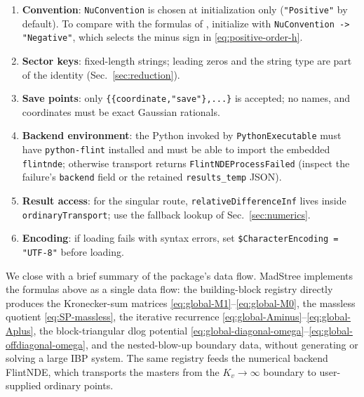 \documentclass[11pt,a4paper]{article}
\begin{document}
\begin{enumerate}
  \item \textbf{Convention}: \texttt{NuConvention} is chosen at initialization only
        (\texttt{"Positive"} by default). To compare with the formulas of
        \citet{Chen:2024jms}, initialize with \texttt{NuConvention -> "Negative"}, which selects
        the minus sign in \eqref{eq:positive-order-h}.
  \item \textbf{Sector keys}: fixed-length strings; leading zeros and the string type are part of
        the identity (Sec.~\ref{sec:reduction}).
  \item \textbf{Save points}: only \texttt{\{\{coordinate,"save"\},...\}} is accepted; no names,
        and coordinates must be exact Gaussian rationals.
  \item \textbf{Backend environment}: the Python invoked by \texttt{PythonExecutable} must have
        \texttt{python-flint} installed and must be able to import the embedded \texttt{flintnde};
        otherwise transport returns \texttt{FlintNDEProcessFailed} (inspect the failure's
        \texttt{backend} field or the retained \texttt{results\_temp} JSON).
  \item \textbf{Result access}: for the singular route, \texttt{relativeDifferenceInf} lives inside
        \texttt{ordinaryTransport}; use the fallback lookup of Sec.~\ref{sec:numerics}.
  \item \textbf{Encoding}: if loading fails with syntax errors, set
        \texttt{\$CharacterEncoding = "UTF-8"} before loading.
\end{enumerate}

We close with a brief summary of the package's data flow. MadStree implements the formulas above as
a single data flow: the building-block registry directly produces the Kronecker-sum matrices
\eqref{eq:global-M1}--\eqref{eq:global-M0}, the massless quotient \eqref{eq:SP-massless}, the
iterative recurrence \eqref{eq:global-Aminus}--\eqref{eq:global-Aplus}, the block-triangular dlog
potential \eqref{eq:global-diagonal-omega}--\eqref{eq:global-offdiagonal-omega}, and the
nested-blow-up boundary data, without generating or solving a large IBP system. The same registry
feeds the numerical backend FlintNDE, which transports the masters from the $K_v\to\infty$
boundary to user-supplied ordinary points.



\end{document}
